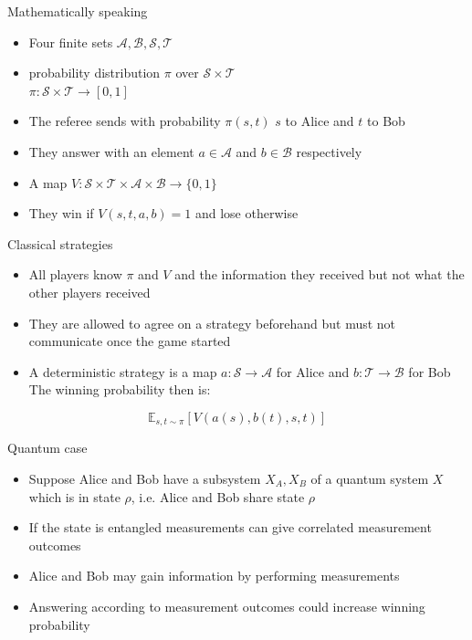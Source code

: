 \begin{frame}{Mathematically speaking}
\begin{itemize}
    \item Four finite sets $\mathcal{A}, \mathcal{B}, \mathcal{S}, \mathcal{T}$
    \item probability distribution $\pi$ over $\mathcal{S} \times \mathcal{T}$ \\ $\pi : \mathcal{S} \times \mathcal{T} \rightarrow [0,1]$
    \item The referee sends with probability $\pi (s,t)$ $s$ to Alice and $t$ to Bob
    \item They answer with an element $a \in \mathcal{A}$ and $b \in \mathcal{B}$ respectively
    \item A map $V : \mathcal{S} \times \mathcal{T} \times \mathcal{A} \times \mathcal{B} \rightarrow \{ 0, 1 \}$
    \item They win if $V(s,t,a,b)=1$ and lose otherwise
\end{itemize}
\end{frame}

\begin{frame}{Classical strategies}
    \begin{itemize}
        \item All players know $\pi$ and $V$ and the information they received but not what the other players received
        \item They are allowed to agree on a strategy beforehand but must not communicate once the game started
        \item A deterministic strategy is a map $a : \mathcal{S} \rightarrow \mathcal{A}$ for Alice and $b : \mathcal{T} \rightarrow \mathcal{B}$ for Bob
        The winning probability then is:
    \end{itemize}
    \begin{equation*}
        \mathbb{E}_{s,t \sim \pi} \left[ V(a(s),b(t),s,t) \right]
\end{equation*}
\end{frame}

\begin{frame}{Quantum case}
\begin{itemize}
    \item Suppose Alice and Bob have a subsystem $X_A, X_B$ of a quantum system $X$ which is in state $\rho$, i.e. Alice and Bob share state $\rho$
    \item If the state is entangled measurements can give correlated measurement outcomes
    \item Alice and Bob may gain information by performing measurements
    \item Answering according to measurement outcomes could increase winning probability 
\end{itemize}
\end{frame}


